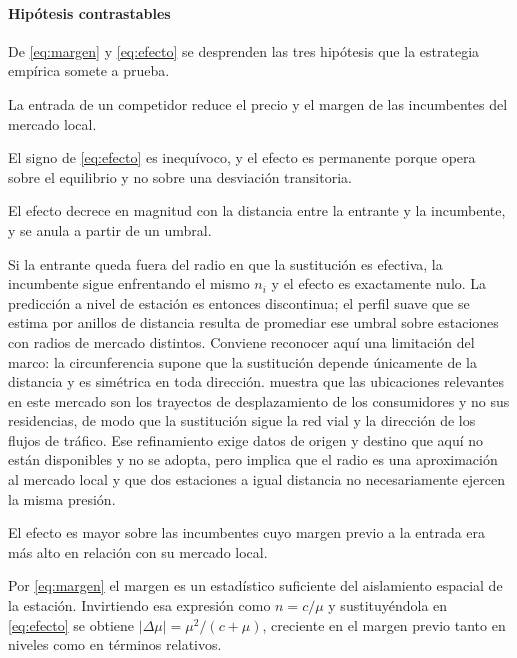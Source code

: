\paragraph{Hipótesis contrastables} De \eqref{eq:margen} y \eqref{eq:efecto} se desprenden las tres hipótesis que la estrategia empírica somete a prueba.

\begin{hipotesis}
\label{hip:nivel}
La entrada de un competidor reduce el precio y el margen de las incumbentes del
mercado local.
\end{hipotesis}
El signo de \eqref{eq:efecto} es inequívoco, y el efecto es permanente porque opera sobre el equilibrio y no sobre una desviación transitoria.

\begin{hipotesis}
\label{hip:distancia}
El efecto decrece en magnitud con la distancia entre la entrante y la incumbente, y se anula a partir de un umbral.
\end{hipotesis}
Si la entrante queda fuera del radio en que la sustitución es efectiva, la incumbente sigue enfrentando el mismo $n_i$ y el efecto es exactamente nulo. La predicción a nivel de estación es entonces discontinua; el perfil suave que se estima por anillos de distancia resulta de promediar ese umbral sobre estaciones con radios de mercado distintos. Conviene reconocer aquí una limitación del marco: la circunferencia supone que la sustitución depende únicamente de la distancia y es simétrica en toda dirección. \textcite{HOUDE2012} muestra que las ubicaciones relevantes en este mercado son los trayectos de desplazamiento de los consumidores y no sus residencias, de modo que la sustitución sigue la red vial y la dirección de los flujos de tráfico. Ese refinamiento exige datos de origen y destino que aquí no están disponibles y no se adopta, pero implica que el radio es una aproximación al mercado local y que dos estaciones a igual distancia no necesariamente ejercen la misma presión.

\begin{hipotesis}
\label{hip:margen}
El efecto es mayor sobre las incumbentes cuyo margen previo a la entrada era más alto en relación con su mercado local.
\end{hipotesis}
Por \eqref{eq:margen} el margen es un estadístico suficiente del aislamiento espacial de la estación. Invirtiendo esa expresión como $n = c/\mu$ y sustituyéndola en \eqref{eq:efecto} se obtiene $|\Delta\mu| = \mu^{2}/(c+\mu)$, creciente en el margen previo tanto en niveles como en términos relativos.
